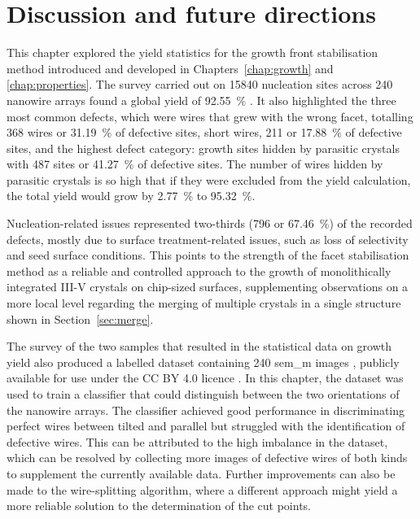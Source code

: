 \section{Discussion and future directions}

This chapter explored the yield statistics for the  growth front stabilisation method introduced and developed in Chapters~\ref{chap:growth} and \ref{chap:properties}. The survey carried out on \num{15840} nucleation sites across \num{240} nanowire arrays found a global yield of \qty{92.55}{\%} \cite{Brugnolotto2023_2}. It also highlighted the three most common defects, which were wires that grew with the wrong facet, totalling \num{368} wires or \qty{31.19}{\%} of defective sites, short wires, \num{211} or \qty{17.88}{\%} of defective sites, and the highest defect category: growth sites hidden by parasitic crystals with \num{487} sites or \qty{41.27}{\%} of defective sites. The number of wires hidden by parasitic crystals is so high that if they were excluded from the yield calculation, the total yield would grow by \qty{2.77}{\%} to \qty{95.32}{\%}.

Nucleation-related issues represented two-thirds (\num{796} or \qty{67.46}{\%}) of the recorded defects, mostly due to surface treatment-related issues, such as loss of selectivity and seed surface conditions. This points to the strength of the facet stabilisation method as a reliable and controlled approach to the growth of monolithically integrated III-V crystals on chip-sized surfaces, supplementing observations on a more local level regarding the merging of multiple crystals in a single structure shown in Section~\ref{sec:merge}.

The survey of the two samples that resulted in the statistical data on growth yield also produced a labelled dataset containing \num{240} \acs{sem_m} images \cite{dataset}, publicly available for use under the CC BY 4.0 licence \cite{CCBY40}. In this chapter, the dataset was used to train a classifier that could distinguish between the two orientations of the nanowire arrays. The classifier achieved good performance in discriminating perfect wires between tilted and parallel but struggled with the identification of defective wires. This can be attributed to the high imbalance in the dataset, which can be resolved by collecting more images of defective wires of both kinds to supplement the currently available data. Further improvements can also be made to the wire-splitting algorithm, where a different approach might yield a more reliable solution to the determination of the cut points.